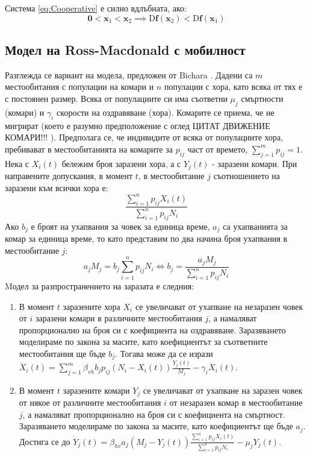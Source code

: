 \begin{definition}
  Система \eqref{eq:Cooperative} е силно вдлъбната, ако:
  \begin{equation*}
    \mathbf{0} < \mathbf{x}_1 < \mathbf{x}_2 \implies \mathrm{D}\mathbf{f}(\mathbf{x}_2) < \mathrm{D}\mathbf{f}(\mathbf{x}_1)
  \end{equation*}
\end{definition}

\subsection{Модел на Ross-Macdonald с мобилност}
Разглежда се вариант на модела, предложен от Bichara \cite{Bichara2016}. Дадени са $m$ местообитания с популации на комари и $n$ популации с хора, като всяка от тях е с постоянен размер. Всяка от популациите си има съответни $\mu_j$ смъртности (комари) и $\gamma_i$ скорости на оздравяване (хора). Комарите се приема, че не мигрират (което е разумно предположение с оглед \color{Red} ЦИТАТ ДВИЖЕНИЕ КОМАРИ!!!
\color{Black}). Предполага се, че индивидите от всяка от популациите хора, пребивават в местообитанията на комарите за $p_{ij}$ част от времето, $\sum_{j=1}^m p_{ij} = 1$. \\
Нека с $X_i(t)$ бележим броя заразени хора, а с $Y_j(t)$ - заразени комари. При направените допускания, в момент $t$, в местообитание $j$ съотношението на заразени към всички хора е:
\begin{equation}
  \frac{\sum_{i=1}^n p_{ij} X_i(t)}{\sum_{i=1}^n p_{ij} N_i}
\end{equation}
Ако $b_j$ е броят на ухапвания за човек за единица време, $a_j$ са ухапванията за комар за единица време, то като представим по два начина броя ухапвания в местообитание $j$:
\begin{equation}
  a_j M_j = b_j \sum_{i=1}^n p_{ij} N_i \iff b_j = \frac{a_j M_j}{\sum_{i=1}^n p_{ij} N_i}
\end{equation}
Mодел за разпространението на заразата е следния:
\begin{enumerate}
  \item В момент $t$ заразените хора $X_i$ се увеличават от ухапване на незаразен човек от $i$ заразени комари в различните местообитания $j$, а намаляват пропорционално на броя си с коефициента на оздравяване. Заразяването моделираме по закона за масите, като коефициентът за съответните местообитания ще бъде $b_j$. Тогава може да се изрази $\dot{X}_i(t) = \sum_{j=1}^{m} \beta_{vh} b_j p_{ij} (N_i - X_i(t)) \frac{Y_j(t)}{M_j} - \gamma_i X_i(t)$.
  \item В момент $t$ заразените комари $Y_j$ се увеличават от ухапване на заразен човек от някое от различните местообитания $i$ от незаразен комар в местообитание $j$, а намаляват пропорционално на броя си с коефициента на смъртност. Заразяването моделираме по закона за масите, като коефициентът ще бъде $a_j$. Достига се до $\dot{Y}_j(t) = \beta_{hv} a_j (M_j - Y_j(t)) \frac{\sum_{i=1}^n p_{ij} X_i(t)}{\sum_{i=1}^n p_{ij} N_i} - \mu_j Y_j(t)$.
\end{enumerate}

